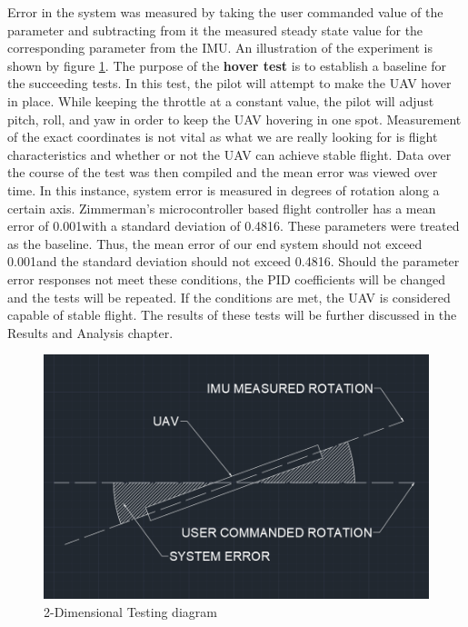\documentclass[english]{upeeei}
\begin{document}
Error in the system was measured by taking the user commanded value of the parameter and subtracting from it the measured steady 
state value for the corresponding parameter from the IMU. An illustration of the experiment is shown by figure \ref{fig:error_diagram}.
\newline
\newline
The purpose of the \textbf{hover test} is to establish a baseline for the succeeding tests. In this test, the pilot
will attempt to make the UAV hover in place. While keeping the throttle at a constant value, the pilot will adjust pitch, roll, and yaw
in order to keep the UAV hovering in one spot. Measurement of the exact coordinates is not vital as what we are really looking for is
flight characteristics and whether or not the UAV can achieve stable flight.
\newline
\newline
Data over the course of the test was then compiled and the mean error was viewed over time. In this instance, system error 
is measured in degrees of rotation along a certain axis. Zimmerman's microcontroller based
flight controller has a mean error of 0.001\textdegree with a standard deviation of 0.4816\textdegree. These parameters were
treated as the baseline. Thus, the mean error of our end system should not exceed 0.001\textdegree and the standard deviation should 
not exceed 0.4816\textdegree. Should the parameter error responses not meet these conditions, the PID coefficients will be changed and the
tests will be repeated. If the conditions are met, the UAV is considered capable of stable flight. The results of these tests will be further
discussed in the Results and Analysis chapter.

\begin{figure}[h]
    \centering
    \includegraphics[scale=0.5]{images/error diagram.PNG}
    \caption{2-Dimensional Testing diagram}
    \label{fig:error_diagram}
\end{figure}
\end{document}
